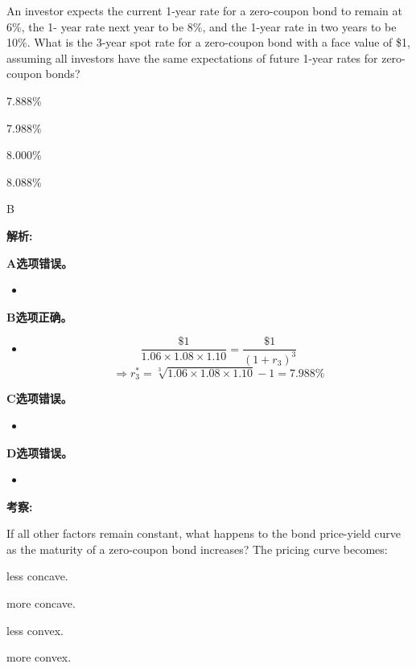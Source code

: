 \documentclass{article}
\newcounter{question} %
\newenvironment{explanation}
{\textbf{解析:}\par}
{\par}
\newcommand{\checklist}[1]{
    \textbf{考察:} #1 \par %
    \addcontentsline{toc}{subsection}{题号\thequestion 考察: #1} %
    \vspace{2em} %
}
\begin{document}
\begin{question}
    An investor expects the current 1-year rate for a zero-coupon bond to remain at 6\%, the 1-
    year rate next year to be 8\%, and the 1-year rate in two years to be 10\%. What is the 3-year
    spot rate for a zero-coupon bond with a face value of \$1, assuming all investors have the same
    expectations of future 1-year rates for zero-coupon bonds?
\end{question}

\begin{choices}
    \item 7.888\%
    \item 7.988\%
    \item 8.000\%
    \item 8.088\%
\end{choices}

\begin{correctanswer}
    B
\end{correctanswer}

\begin{explanation}
    \textbf{A选项错误。}
    \begin{itemize}
        \item 
    \end{itemize}
    \textbf{B选项正确。}
    \begin{itemize}
        \item \[
\frac{\$1}{1.06 \times 1.08 \times 1.10} = \frac{\$1}{(1 + r_3)^3}
\]
\[
\Rightarrow r_3^* = \sqrt[3]{1.06 \times 1.08 \times 1.10} - 1 = 7.988\%
\]
    \end{itemize}
    \textbf{C选项错误。}
    \begin{itemize}
        \item 
    \end{itemize}
    \textbf{D选项错误。}
    \begin{itemize}
        \item 
    \end{itemize}
\end{explanation}
\checklist{}


\begin{question}
    If all other factors remain constant, what happens to the bond price-yield curve as the maturity of a zero-coupon bond increases? The pricing curve becomes:
\end{question}

\begin{choices}
    \item less concave.
    \item more concave.
    \item less convex.
    \item more convex.
\end{choices}
\end{document}
